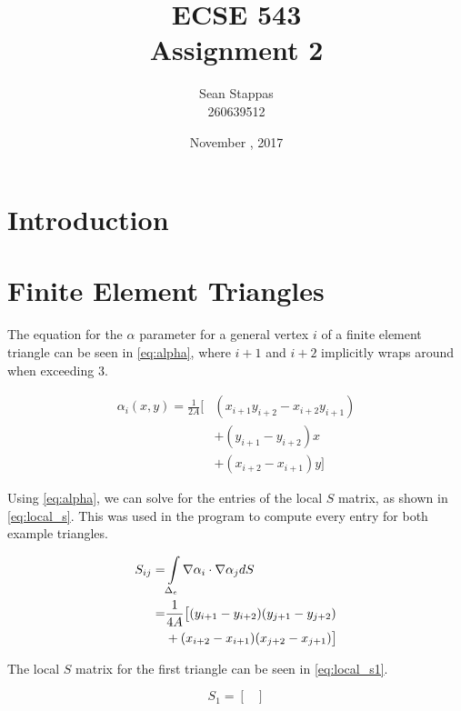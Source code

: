 \documentclass[a4paper,titlepage]{article}
\title{\textbf{ECSE 543 \\ Assignment 2}}
\author{Sean Stappas \\ 260639512}
\date{November \nth{20}, 2017}
\begin{document}
	\sloppy
	\maketitle
	
	\tableofcontents
	
	
	\twocolumn
	
	\section*{Introduction}
	
	\section{Finite Element Triangles}
	
	The equation for the $\alpha$ parameter for a general vertex $i$ of a finite element triangle can be seen in \cref{eq:alpha}, where $i+1$ and $i+2$ implicitly wraps around when exceeding 3.
	
	\begin{equation} \label{eq:alpha}
		\begin{split}
			\alpha_i(x, y) = \frac{1}{2A} \big[
			& (x_{i+1}y_{i+2} - x_{i+2}y_{i+1}) \\
			& + (y_{i+1} - y_{i+2})x \\
			& + (x_{i+2} - x_{i+1})y \big]
		\end{split}
	\end{equation}
	
	Using \cref{eq:alpha}, we can solve for the entries of the local $S$ matrix, as shown in \cref{eq:local_s}. This was used in the program to compute every entry for both example triangles.
	
	\begin{equation} \label{eq:local_s}
		\begin{split}
			S_{ij} 
			= &\int\displaylimits_{\Delta_e}\nabla\alpha_i\cdot\nabla\alpha_j dS \\
			= &\frac{1}{4A} \big[ (y_{i+1} - y_{i+2})(y_{j+1} - y_{j+2}) \\
			&+ (x_{i+2} - x_{i+1})(x_{j+2} - x_{j+1})
			\big]
		\end{split}
	\end{equation}
	
	The local $S$ matrix for the first triangle can be seen in \cref{eq:local_s1}.
	
	\begin{equation} \label{eq:local_s1}
		S_1 =
			\begin{bmatrix}
				
			\end{bmatrix}
	\end{equation}
	
\end{document}
